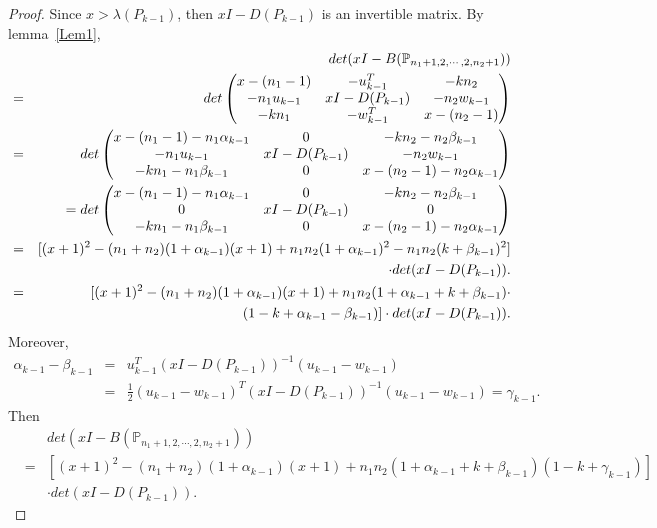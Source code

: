 \documentclass[10pt]{article}
\begin{document}
\begin{proof}
Since $x>\lambda({P_{k-1}})$, then $x I-D(P_{k-1})$ is an invertible matrix. By lemma~\ref{Lem1},
\begin{eqnarray*}
&&det (x I -B(\mathbb{P}_{n_1+1,2,\cdots,2,n_2+1}))\\
&=&det \left(\begin{matrix}
x -(n_1-1)&-u_{k-1}^T&-kn_2\cr
-n_1u_{k-1} &x I-D(P_{k-1}) &-n_2w_{k-1} \cr
-kn_1&-w_{k-1}^T &x-( n_2-1)
\end{matrix}\right)\\
&=&det \left(\begin{matrix}
x -(n_1-1)-n_1\alpha_{k-1}&0&-kn_2-n_2\beta_{k-1}\cr
-n_1u_{k-1} &x I-D(P_{k-1}) &-n_2w_{k-1} \cr
-kn_1-n_1\beta_{k-1}&0&x-( n_2-1)-n_2\alpha_{k-1}
\end{matrix}\right)\\
&&=det \left(\begin{matrix}
x -(n_1-1)-n_1\alpha_{k-1}&0&-kn_2-n_2\beta_{k-1}\cr
0 &x I-D(P_{k-1}) &0\cr
-kn_1-n_1\beta_{k-1}&0&x-( n_2-1)-n_2\alpha_{k-1}
\end{matrix}\right)\\
&=&[ (x+1)^2-(n_1+n_2)(1+\alpha_{k-1} )(x+1)+n_1n_2 (1+\alpha_{k-1} )^2-n_1n_2 (k+\beta_{k-1} )^2]\\
&&\cdot det(x I-D(P_{k-1})).\\
&=&[ (x+1)^2-(n_1+n_2)(1+\alpha_{k-1} )(x+1)+n_1n_2 (1+\alpha_{k-1}+k+\beta_{k-1} )\cdot\\
&&(1-k+\alpha_{k-1}-\beta_{k-1})]\cdot det(x I-D(P_{k-1})).
\end{eqnarray*}
Moreover,
\begin{eqnarray*}
\alpha_{k-1}-\beta_{k-1}&=&u_{k-1}^T(x I-D(P_{k-1}))^{-1}(u_{k-1}-w_{k-1})\\
&=&\frac{1}{2}(u_{k-1}-w_{k-1})^T(x I-D(P_{k-1}))^{-1}(u_{k-1}-w_{k-1})=\gamma_{k-1}. \end{eqnarray*}
Then
\begin{eqnarray*}
&&det (x I -B(\mathbb{P}_{n_1+1,2,\cdots,2,n_2+1}))\\
&=&[ (x+1)^2-(n_1+n_2)(1+\alpha_{k-1} )(x+1)+n_1n_2 (1+\alpha_{k-1}+k+\beta_{k-1} )(1-k+\gamma_{k-1})]\\
&&\cdot det(x I-D(P_{k-1})).
\end{eqnarray*}
\end{proof}
\end{document}
